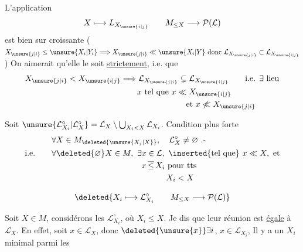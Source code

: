 
 L'application
\[
 X\longmapsto L_{X_{\unsure{i|j}}}\qquad
 M_{\leq X}\longrightarrow\mathcal P(\mathcal{L})
\]
est bien sur croissante ($X_{\unsure{j|i}}\leq \unsure{X_i|Y_i}\Longrightarrow X_{\unsure{j|i}}\ll \unsure{X_i|Y}\text{ donc }\mathcal{L}_{X_{\unsure{j|i}}}\subset \mathcal{L}_{X_{\unsure{i|j}}}$) On aimerait qu'elle le soit \uline{strictement}, i.e. que 
\[
\begin{aligned}
 X_{\unsure{j|i}}<X_{\unsure{i|j}}&\Longrightarrow \mathcal{L}_{X_{\unsure{j|i}}}\subsetneq \mathcal{L}_{X_{\unsure{i|j}}}\qquad\text{i.e. }\exists\ \text{lieu}\\
 &\qquad x\ \text{tel que }x\ll X_{\unsure{i|j}}\\
 &\hspace{8em}\text{et }x\not\ll X_{\unsure{j|i}}
\end{aligned}
\]

 Soit $\unsure{\mathcal{L}_{X_i}^{\circ}|\mathcal{L}_X^{\circ}}=\mathcal{L}_X\setminus\bigcup_{X_i<X}\mathcal{L}_{X_i}$. Condition plus forte
\[
\begin{aligned}
 &\forall X\in M_{\deleted{\unsure{X_j|X}}},\quad \mathcal{L}_X^{\circ}\ne\varnothing\ \text{.-}\\
 \text{i.e.}\qquad &\forall\deleted{\varnothing}X\in M,\ \exists x\in \mathcal{L},\ \inserted{\text{tel que}}\ x\ll X,\ \text{et}\\
 &\hspace{11em}x\,\overline{\leq}\,X_i\ \text{pour tts}\\
 &\hspace{14em}X_i<X
\end{aligned}
\]

\[
 \deleted{X_i\longmapsto \mathcal{L}_{X_i}^{\circ}\qquad M_{\leq X}\longrightarrow\mathcal P(\mathcal{L})}
\]

Soit $X\in M$, considérons les $\mathcal{L}_{X_i}^{\circ}$, où $X_i\leq X$. Je dis que leur réunion  est \uline{égale} à $\mathcal{L}_X$. En effet, soit $x\in \mathcal{L}_X$, donc $\deleted{\unsure{x}}\exists i$, $x\in \mathcal{L}_{X_i}$,  Il y a un $X_i$ minimal parmi les

